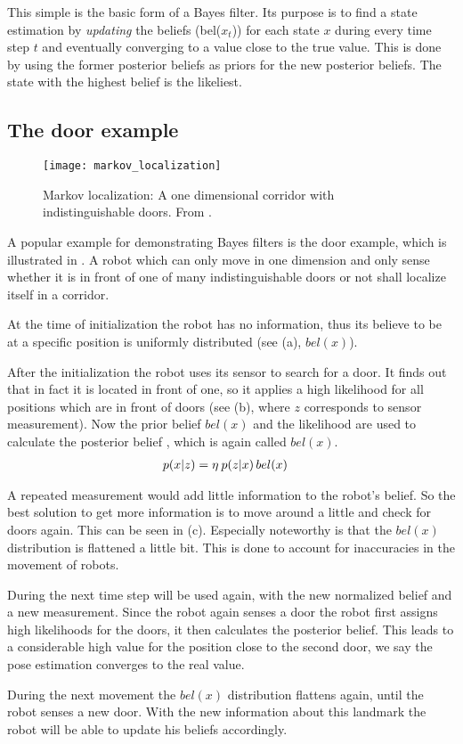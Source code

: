 \documentclass[Thesis.tex]{subfiles}
\begin{document}
This simple  is the basic form of a Bayes filter. Its purpose is to find a state estimation by \emph{updating} the beliefs (bel($x_t$)) for each state $x$ during every time step $t$ and eventually converging to a value close to the true value. This is done by using the former posterior beliefs as priors for the new posterior beliefs.
The state with the highest belief is the likeliest.

\subsection{The door example}
\begin{figure}
  \centering
  \texttt{[image: markov\_localization]}
  \caption{Markov localization: A one dimensional corridor with indistinguishable doors. From \cite[p.~6]{ThrunBurgardFox:2005}.}
  \label{fig:markov_localization_one_dimension}
\end{figure}

A popular example for demonstrating Bayes filters is the door example, which is illustrated in . A robot which can only move in one dimension and only sense whether it is in front of one of many indistinguishable doors or not shall localize itself in a corridor. 

At the time of initialization the robot has no information, thus its believe to be at a specific position is uniformly distributed (see (a), $bel(x)$).

After the initialization the robot uses its sensor to search for a door. It finds out that in fact it is located in front of one, so it applies a high likelihood for all positions which are in front of doors (see (b),  where $z$ corresponds to sensor measurement). Now the prior belief $bel(x)$ and the likelihood  are used to calculate the posterior belief , which is again called $bel(x)$.
%
\begin{align}
p\!\left({x}\middle|{z}\right) &= \eta\: p\!\left({z}\middle|{x}\right) bel(x) \label{eq:door_bayes}
\end{align}

A repeated measurement would add little information to the robot's belief. So the best solution to get more information is to move around a little and check for doors again. This can be seen in (c). Especially noteworthy is that the $bel(x)$ distribution is flattened a little bit. This is done to account for inaccuracies in the movement of robots.

During the next time step  will be used again, with the new normalized belief and a new measurement. Since the robot again senses a door the robot first assigns high likelihoods for the doors, it then calculates the posterior belief. This leads to a considerable high value for the position close to the second door, we say the pose estimation converges to the real value. 

During the next movement the $bel(x)$ distribution flattens again, until the robot senses a new door. With the new information about this landmark the robot will be able to update his beliefs accordingly.
\end{document}
